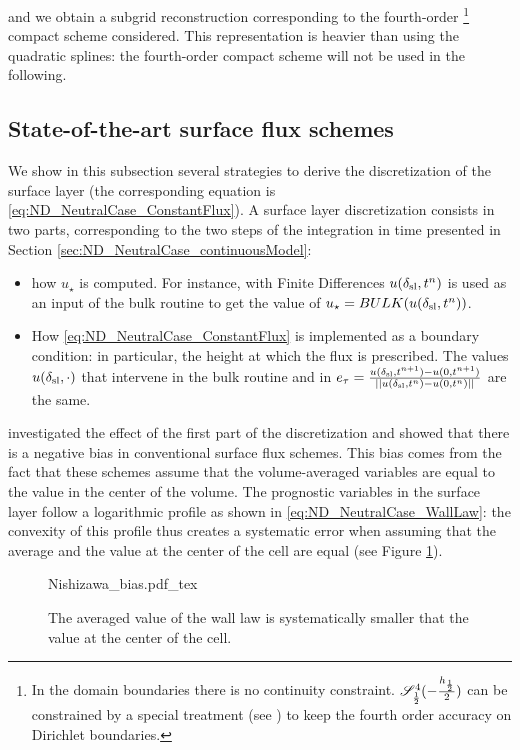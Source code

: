 and we obtain a subgrid reconstruction corresponding to
the fourth-order
\footnote{
In the domain boundaries there is no continuity constraint.
${\cal S}^4_{\frac{1}{2}}(-\frac{h_{\frac{1}{2}}}{2})$
can be constrained by a special treatment
(see \cite{piller_finite-volume_2004})
to keep the fourth order accuracy on Dirichlet boundaries.
}
compact scheme considered.
This representation is heavier than using the quadratic splines:
the fourth-order compact scheme will not be used in the
following.


\subsection{State-of-the-art surface flux schemes}
\label{sec:ND_NeutralCase_strategies}
We show in this subsection several strategies to derive the
discretization of the surface layer (the corresponding equation
is \eqref{eq:ND_NeutralCase_ConstantFlux}).
A surface layer discretization consists in two parts,
corresponding to the two steps of the integration in time
presented in Section \ref{sec:ND_NeutralCase_continuousModel}:
\begin{itemize}
	\item how $u_\star$ is computed.
		For instance, with Finite Differences
		$u(\delta_{\rm sl}, t^n)$ is 
		used as an input of the
		bulk routine to get the value of
		$u_\star = BULK(u(\delta_{\rm sl}, t^n))$.
	\item How \eqref{eq:ND_NeutralCase_ConstantFlux}
		is implemented as
		a boundary condition: in particular,
		the height at which the flux is prescribed.
		The values $u(\delta_{\rm sl}, \cdot)$ that intervene
		in the bulk routine and in
		$e_\tau= \frac{u(\delta_{\rm sl},
		t^{n+1})-u(0,t^{n+1})}
		{||u(\delta_{\rm sl}, t^n)-u(0,t^n)||}$
		are the same.
\end{itemize}
\cite{nishizawa_surface_2018} investigated the effect of the
first part of the discretization and showed that there is a
negative bias in conventional surface flux schemes. This
bias comes from the fact that these schemes assume that the
volume-averaged variables are equal to the value in the center
of the volume. The prognostic variables in the surface layer
follow a logarithmic profile as shown in
\eqref{eq:ND_NeutralCase_WallLaw}: the convexity of this profile thus
creates a systematic error when assuming that the average and the
value at the center of the cell are equal
(see Figure \ref{fig:ND_NeutralCase_nishizawaBias}).
\begin{figure}
	\centering
	{Nishizawa_bias.pdf_tex}
	\caption{The averaged value of the wall law is
		systematically smaller that the value at
		the center of the cell.}
	\label{fig:ND_NeutralCase_nishizawaBias}
\end{figure}

